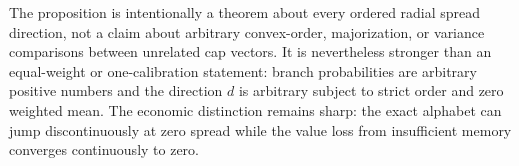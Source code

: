 The proposition is intentionally a theorem about every ordered radial spread direction, not a claim about arbitrary convex-order, majorization, or variance comparisons between unrelated cap vectors. It is nevertheless stronger than an equal-weight or one-calibration statement: branch probabilities are arbitrary positive numbers and the direction $d$ is arbitrary subject to strict order and zero weighted mean. The economic distinction remains sharp: the exact alphabet can jump discontinuously at zero spread while the value loss from insufficient memory converges continuously to zero.